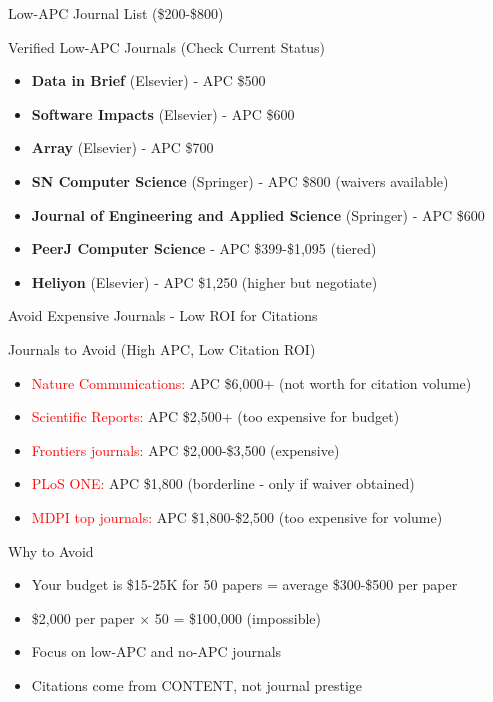 \documentclass[11pt]{beamer}
\begin{document}
	\begin{frame}{Low-APC Journal List (\$200-\$800)}
		\scriptsize
		\begin{block}{Verified Low-APC Journals (Check Current Status)}
			\begin{itemize}
				\item \textbf{Data in Brief} (Elsevier) - APC \$500
				\item \textbf{Software Impacts} (Elsevier) - APC \$600
				\item \textbf{Array} (Elsevier) - APC \$700
				\item \textbf{SN Computer Science} (Springer) - APC \$800 (waivers available)
				\item \textbf{Journal of Engineering and Applied Science} (Springer) - APC \$600
				\item \textbf{PeerJ Computer Science} - APC \$399-\$1,095 (tiered)
				\item \textbf{Heliyon} (Elsevier) - APC \$1,250 (higher but negotiate)
			\end{itemize}
		\end{block}
		
	\end{frame}
	
	\begin{frame}{Avoid Expensive Journals - Low ROI for Citations}
		\scriptsize
		\begin{block}{Journals to Avoid (High APC, Low Citation ROI)}
			\begin{itemize}
				\item \textcolor{red}{Nature Communications:} APC \$6,000+ (not worth for citation volume)
				\item \textcolor{red}{Scientific Reports:} APC \$2,500+ (too expensive for budget)
				\item \textcolor{red}{Frontiers journals:} APC \$2,000-\$3,500 (expensive)
				\item \textcolor{red}{PLoS ONE:} APC \$1,800 (borderline - only if waiver obtained)
				\item \textcolor{red}{MDPI top journals:} APC \$1,800-\$2,500 (too expensive for volume)
			\end{itemize}
		\end{block}
		\begin{block}{Why to Avoid}
			\begin{itemize}
				\item Your budget is \$15-25K for 50 papers = average \$300-\$500 per paper
				\item \$2,000 per paper × 50 = \$100,000 (impossible)
				\item Focus on low-APC and no-APC journals
				\item Citations come from CONTENT, not journal prestige
			\end{itemize}
		\end{block}
	\end{frame}
	
\end{document}
